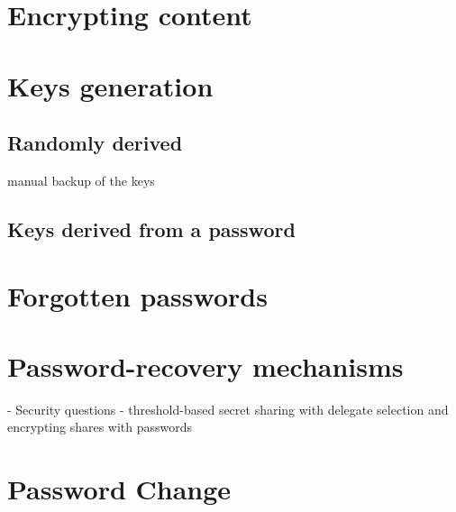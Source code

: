 \section{Encrypting content}

\section{Keys generation}
\subsection{Randomly derived}
  manual backup of the keys
\subsection{Keys derived from a password}

\section{Forgotten passwords}

\section{Password-recovery mechanisms}
  - Security questions
  - threshold-based secret sharing with delegate selection and encrypting
  shares with passwords

\section{Password Change}
